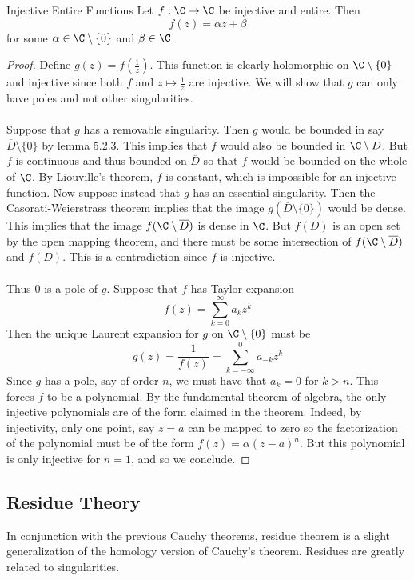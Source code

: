 \documentclass[a4paper]{article}
\begin{document}
\begin{thm}{Injective Entire Functions}{} Let $f:\C\to\C$ be injective and entire. Then $$f(z)=\alpha z+\beta$$ for some $\alpha\in\C\setminus\{0\}$ and $\beta\in\C$. \tcbline
\begin{proof}
Define $g(z)=f\left(\frac{1}{z}\right)$. This function is clearly holomorphic on $\C\setminus\{0\}$ and injective since both $f$ and $z\mapsto\frac{1}{z}$ are injective. We will show that $g$ can only have poles and not other singularities. \\~\\

Suppose that $g$ has a removable singularity. Then $g$ would be bounded in say $\overline{D}\setminus\{0\}$ by lemma 5.2.3. This implies that $f$ would also be bounded in $\C\setminus D$. But $f$ is continuous and thus bounded on $\overline{D}$ so that $f$ would be bounded on the whole of $\C$. By Liouville's theorem, $f$ is constant, which is impossible for an injective function. Now suppose instead that $g$ has an essential singularity. Then the Casorati-Weierstrass theorem implies that the image $g(\overline{D}\setminus\{0\})$ would be dense. This implies that the image $f(\C\setminus\overline{D})$ is dense in $\C$. But $f(D)$ is an open set by the open mapping theorem, and there must be some intersection of $f(\C\setminus\overline{D})$ and $f(D)$. This is a contradiction since $f$ is injective. \\~\\

Thus $0$ is a pole of $g$. Suppose that $f$ has Taylor expansion $$f(z)=\sum_{k=0}^\infty a_kz^k$$ Then the unique Laurent expansion for $g$ on $\C\setminus\{0\}$ must be $$g(z)=\frac{1}{f(z)}=\sum_{k=-\infty}^0 a_{-k}z^k$$ Since $g$ has a pole, say of order $n$, we must have that $a_k=0$ for $k>n$. This forces $f$ to be a polynomial. By the fundamental theorem of algebra, the only injective polynomials are of the form claimed in the theorem. Indeed, by injectivity, only one point, say $z=a$ can be mapped to zero so the factorization of the polynomial must be of the form $f(z)=\alpha(z-a)^n$. But this polynomial is only injective for $n=1$, and so we conclude. 
\end{proof}
\end{thm}

\subsection{Residue Theory}
In conjunction with the previous Cauchy theorems, residue theorem is a slight generalization of the homology version of Cauchy's theorem. Residues are greatly related to singularities. 
\end{document}
